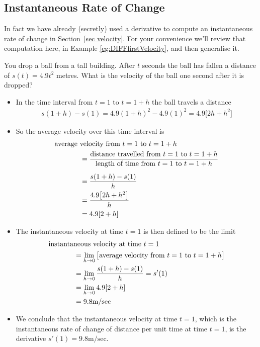 \subsection*{Instantaneous Rate of Change}


In fact we have already (secretly) used a derivative to compute an instantaneous rate of
change in Section~\ref{sec velocity}. For your convenience we'll review that computation
here, in Example \ref{eg:DIFFfirstVelocity}, and then generalise it.

\begin{eg}\label{eg:DIFFfirstVelocity}
You drop a ball from a tall building. After $t$ seconds the ball has fallen
a distance of $s(t)=4.9 t^2$ metres. What is the velocity of the ball one
second after it is dropped?

\begin{itemize}
 \item In the time interval from $t=1$ to $t=1+h$ the ball travels
a distance
\begin{align*}
s(1+h)-s(1)=4.9 (1+h)^2 - 4.9 (1)^2
           =4.9\big[2h+h^2\big]
\end{align*}
\item So the average velocity over this time interval is
\begin{align*}
&\text{average velocity from $t=1$ to $t=1+h$} \\
&\hskip0.5in=\frac{\text{distance travelled from $t=1$ to $t=1+h$}}
       {\text{length of time from $t=1$ to $t=1+h$}} \\[5pt]
&\hskip0.5in=\frac{s(1+h)-s(1)}{h} \\
&\hskip0.5in=\frac{4.9\big[2h+h^2\big]}{h} \\
&\hskip0.5in=4.9[2+h]
\end{align*}
\item The instantaneous velocity at time $t=1$ is then defined to be the limit
\begin{align*}
&\text{instantaneous velocity at time $t=1$} \\
&\hskip0.5in=\lim_{h\rightarrow 0}
\big[\text{average velocity from $t=1$ to $t=1+h$}\big]\\
&\hskip0.5in=\lim_{h\rightarrow 0}\frac{s(1+h)-s(1)}{h} = s'(1) \\
&\hskip0.5in= \lim_{h\rightarrow 0} 4.9[2+h] \\
&\hskip0.5in= 9.8\text{m/sec}
\end{align*}
\item We conclude that the instantaneous velocity at time $t=1$,
which is the instantaneous rate of change of distance per unit time
at time $t=1$, is the derivative  $s'(1)=9.8\text{m/sec}$.
\end{itemize}

\end{eg}

